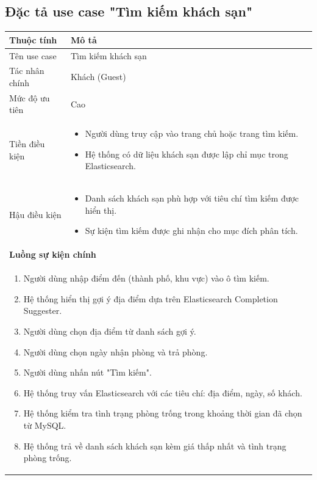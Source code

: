 \documentclass[13pt,a4paper,twoside]{report}
\begin{document}
\subsection{Đặc tả use case "Tìm kiếm khách sạn"}

\begin{longtable}{p{3.5cm} p{11.5cm}}
  \toprule
  \textbf{Thuộc tính} & \textbf{Mô tả} \\
  \midrule
  Tên use case & Tìm kiếm khách sạn \\
  Tác nhân chính & Khách (Guest) \\
  Mức độ ưu tiên & Cao \\
  \midrule
  Tiền điều kiện &
  \begin{itemize}[nosep]
    \item Người dùng truy cập vào trang chủ hoặc trang tìm kiếm.
    \item Hệ thống có dữ liệu khách sạn được lập chỉ mục trong Elasticsearch.
  \end{itemize} \\
  \midrule
  Hậu điều kiện &
  \begin{itemize}[nosep]
    \item Danh sách khách sạn phù hợp với tiêu chí tìm kiếm được hiển thị.
    \item Sự kiện tìm kiếm được ghi nhận cho mục đích phân tích.
  \end{itemize} \\
  \midrule
  \multicolumn{2}{p{15cm}}{\textbf{Luồng sự kiện chính}} \\
  \midrule
  \multicolumn{2}{p{15cm}}{%
    \begin{enumerate}[nosep]
      \item Người dùng nhập điểm đến (thành phố, khu vực) vào ô tìm kiếm.
      \item Hệ thống hiển thị gợi ý địa điểm dựa trên Elasticsearch Completion Suggester.
      \item Người dùng chọn địa điểm từ danh sách gợi ý.
      \item Người dùng chọn ngày nhận phòng và trả phòng.
      \item Người dùng nhấn nút "Tìm kiếm".
      \item Hệ thống truy vấn Elasticsearch với các tiêu chí: địa điểm, ngày, số khách.
      \item Hệ thống kiểm tra tình trạng phòng trống trong khoảng thời gian đã chọn từ MySQL.
      \item Hệ thống trả về danh sách khách sạn kèm giá thấp nhất và tình trạng phòng trống.

\end{enumerate}}
\end{longtable}
\end{document}

